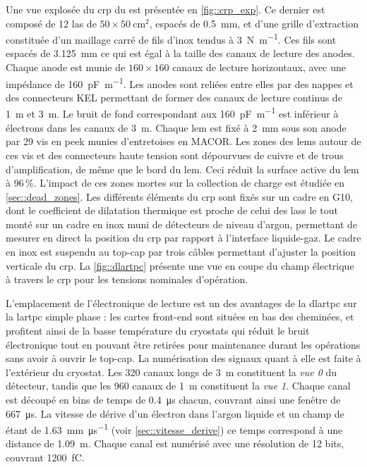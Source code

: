       Une vue explosée du \gls{crp} du \TOO{} est présentée en \autoref{fig::crp_exp}. Ce dernier est composé de 12 \gls{las} de $50\times\SI{50}{\centi\meter\squared}$,  espacés de \SI{0.5}{\milli\meter}, et d'une grille d'extraction constituée d'un maillage carré de fils d'inox tendus à \SI{3}{\newton\per\meter}. Ces fils sont espacés de \SI{3.125}{\milli\meter} ce qui est égal à la taille des canaux de lecture des anodes. Chaque anode est munie de $160\times160$ canaux de lecture horizontaux, avec une impédance de \SI{160}{\pico\farad\per\meter}. Les anodes sont reliées entre elles par des nappes et des connecteurs KEL permettant de former des canaux de lecture continus de \SI{1}{\meter} et \SI{3}{\meter}. Le bruit de fond correspondant aux \SI{160}{\pico\farad\per\meter} est inférieur à  électrons dans les canaux de \SI{3}{\meter}\cite{Aimard2018}. Chaque \gls{lem} est fixé à \SI{2}{\milli\meter} sous son anode par 29 vis en \gls{peek} munies d'entretoises en MACOR. Les zones des \glspl{lem} autour de ces vis et des connecteurs haute tension sont dépourvues de cuivre et de trous d'amplification, de même que le bord du \gls{lem}. Ceci réduit la surface active du \gls{lem} à 96\,\%. L'impact de ces zones mortes sur la collection de charge est étudiée en \autoref{sec::dead_zones}. Les différents éléments du \gls{crp} sont fixés sur un cadre en G10, dont le coefficient de dilatation thermique est proche de celui des \glspl{las} le tout monté sur un cadre en inox muni de détecteurs de niveau d'argon, permettant de mesurer en direct la position du \gls{crp} par rapport à l'interface liquide-gaz. Le cadre en inox est suspendu au top-cap par trois câbles permettant d'ajuster la position verticale du \gls{crp}. La \autoref{fig::dlartpc} présente une vue en coupe du champ électrique à travers le \gls{crp} pour les tensions nominales d'opération.

      L'emplacement de l'électronique de lecture est un des avantages de la \gls{dlartpc} sur la \gls{lartpc} simple phase : les cartes front-end sont situées en bas des cheminées, et profitent ainsi de la basse température du cryostats qui réduit le bruit électronique tout en pouvant être retirées pour maintenance durant les opérations sans avoir à ouvrir le top-cap. La numérisation des signaux quant à elle est faite à l'extérieur du cryostat. Les 320 canaux longs de \SI{3}{\meter} constituent la \textit{vue 0} du détecteur, tandis que les 960 canaux de \SI{1}{\meter} constituent la \textit{vue 1}. Chaque canal est découpé en  bins de temps de \SI{0.4}{\micro\second} chacun, couvrant ainsi une fenêtre de \SI{667}{\micro\second}. La vitesse de dérive d'un électron dans l'argon liquide et un champ de \driftfield{} étant de \SI{1.63}{\milli\meter\per\micro\second} (voir \autoref{sec::vitesse_derive}) ce temps correspond à une distance de \SI{1.09}{\meter}. Chaque canal est numérisé avec une résolution de 12 bits, couvrant \SI{1200}{\femto\coulomb}.

